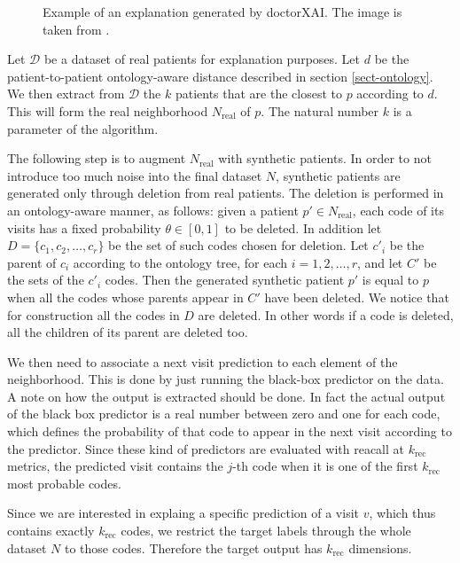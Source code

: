 \documentclass[]{marticle}
\newcommand{\ds}{\mathcal{D}}
\begin{document}
\begin{figure}[!tb] 
\caption{
    Example of an explanation generated by doctorXAI. The image is taken from \cite{panigutti-xai}.
} 
\label{fig:explanation} 
\end{figure}

\newcommand{\realds}{N_\text{real}}

Let $\ds$ be a dataset of real patients for explanation purposes. Let $d$ be the patient-to-patient
ontology-aware distance described in section \ref{sect-ontology}. We then extract from $\ds$ the $k$
patients that are the closest to $p$ according to $d$. This will form the real neighborhood
$\realds$ of $p$. The natural number $k$ is a parameter of the algorithm.

The following step is to augment $\realds$ with synthetic patients. In order to not introduce too
much noise into the final dataset $N$, synthetic patients are generated only through deletion from
real patients. The deletion is performed in an ontology-aware manner, as follows: given a patient
$p'\in \realds$, each code of its visits has a fixed probability $\theta\in [0,1]$ to be deleted. In
addition let $D=\{c_1, c_2, \dots, c_r\}$ be the set of such codes chosen for deletion. Let $c'_i$
be the parent of $c_i$ according to the ontology tree, for each $i=1,2,\dots,r$, and let $C'$ be the
sets of the $c'_i$ codes. Then the generated synthetic patient $p'$ is equal to $p$ when all the
codes whose parents appear in $C'$ have been deleted. We notice that for construction all the codes
in $D$ are deleted. In other words if a code is deleted, all the children of its parent are deleted
too.

We then need to associate a next visit prediction to each element of the neighborhood. This is done
by just running the black-box predictor on the data. A note on how the output is extracted should be
done. In fact the actual output of the black box predictor is a real number between zero and one for
each code, which defines the probability of that code to appear in the next visit according to the
predictor. Since these kind of predictors are evaluated with reacall at $k_\text{rec}$ metrics, the
predicted visit contains the $j$-th code when it is one of the first $k_\text{rec}$ most probable
codes. 

Since we are interested in explaing a specific prediction of a visit $v$, which thus contains
exactly $k_\text{rec}$ codes, we restrict the target labels through the whole dataset $N$ to those
codes. Therefore the target output has $k_\text{rec}$ dimensions.
\end{document}
